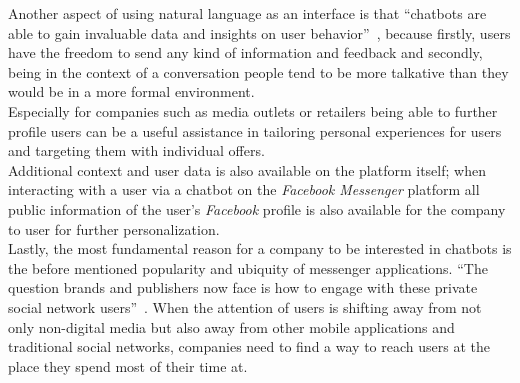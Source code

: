 Another aspect of using natural language as an interface is that ``chatbots are able to gain invaluable data and insights on user behavior''~\cite{drum},
because firstly, users have the freedom to send any kind of information and feedback and
secondly, being in the context of a conversation people tend to be more talkative than they would be in a more formal environment.
\\
Especially for companies such as media outlets or retailers being able to further profile users can be a useful assistance in tailoring personal experiences for users and targeting them with individual offers.
\\
Additional context and user data is also available on the platform itself;
when interacting with a user via a chatbot on the \emph{Facebook Messenger} platform all public information of the user's \emph{Facebook} profile is also available for the company to user for further personalization.
\\

Lastly, the most fundamental reason for a company to be interested in chatbots is the before mentioned popularity and ubiquity of messenger applications.
``The question brands and publishers now face is how to engage with these private social network users''~\cite{drum}.
When the attention of users is shifting away from not only non-digital media but also away from other mobile applications
and traditional social networks, companies need to find a way to reach users at the place they spend most of their time at.
